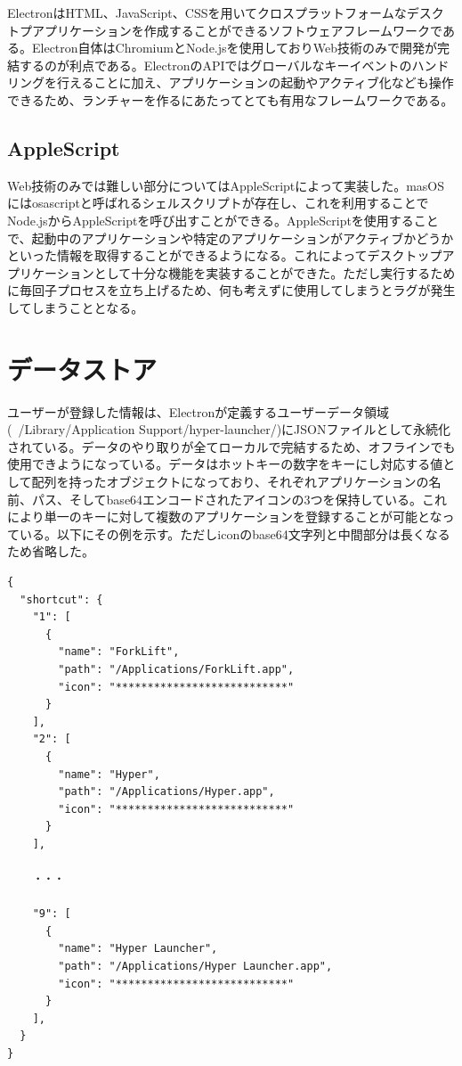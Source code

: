 ElectronはHTML、JavaScript、CSSを用いてクロスプラットフォームなデスクトプアプリケーションを作成することができるソフトウェアフレームワークである。Electron自体はChromiumとNode.jsを使用しておりWeb技術のみで開発が完結するのが利点である。ElectronのAPIではグローバルなキーイベントのハンドリングを行えることに加え、アプリケーションの起動やアクティブ化なども操作できるため、ランチャーを作るにあたってとても有用なフレームワークである。

\subsection{AppleScript}

Web技術のみでは難しい部分についてはAppleScriptによって実装した。masOSにはosascriptと呼ばれるシェルスクリプトが存在し、これを利用することでNode.jsからAppleScriptを呼び出すことができる。AppleScriptを使用することで、起動中のアプリケーションや特定のアプリケーションがアクティブかどうかといった情報を取得することができるようになる。これによってデスクトップアプリケーションとして十分な機能を実装することができた。ただし実行するために毎回子プロセスを立ち上げるため、何も考えずに使用してしまうとラグが発生してしまうこととなる。

\section{データストア}

ユーザーが登録した情報は、Electronが定義するユーザーデータ領域(~/Library/Application Support/hyper-launcher/)にJSONファイルとして永続化されている。データのやり取りが全てローカルで完結するため、オフラインでも使用できようになっている。データはホットキーの数字をキーにし対応する値として配列を持ったオブジェクトになっており、それぞれアプリケーションの名前、パス、そしてbase64エンコードされたアイコンの3つを保持している。これにより単一のキーに対して複数のアプリケーションを登録することが可能となっている。以下にその例を示す。ただしiconのbase64文字列と中間部分は長くなるため省略した。

\begin{lstlisting}[caption=config.json]
{
  "shortcut": {
    "1": [
      {
        "name": "ForkLift",
        "path": "/Applications/ForkLift.app",
        "icon": "***************************"
      }
    ],
    "2": [
      {
        "name": "Hyper",
        "path": "/Applications/Hyper.app",
        "icon": "***************************"
      }
    ],
    
    ・・・
    
    "9": [
      {
        "name": "Hyper Launcher",
        "path": "/Applications/Hyper Launcher.app",
        "icon": "***************************"
      }
    ],
  }
}
\end{lstlisting}